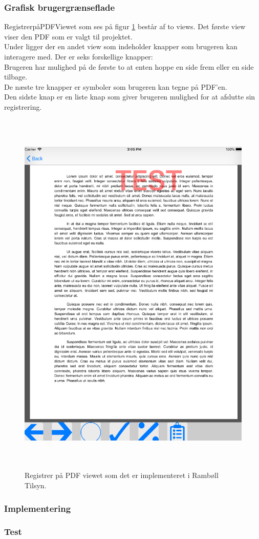 \subsubsection{Grafisk brugergrænseflade}
RegistrerpåPDFViewet som ses på figur \ref{fig:RegistrerObjekterView} består af to views. Det første view viser den PDF som er valgt til projektet. \\
Under ligger der en andet view som indeholder knapper som brugeren kan interagere med. Der er seks forskellige knapper: \\
Brugeren har mulighed på de første to at enten hoppe en side frem eller en side tilbage. \\
De næste tre knapper er symboler som brugeren kan tegne på PDF'en. \\
Den sidste knap er en liste knap som giver brugeren mulighed for at afslutte sin registrering.
\begin{figure}[H] %
	\centering
	\includegraphics[height=18cm, width=15cm]{Design/Applikation/RegistrePDF/PDF}
	\caption{Registrer på PDF viewet som det er implementeret i Rambøll Tilsyn.}
	\label{fig:RegistrerObjekterView}
\end{figure}

\subsubsection{Implementering}

\subsubsection{Test}

\clearpage